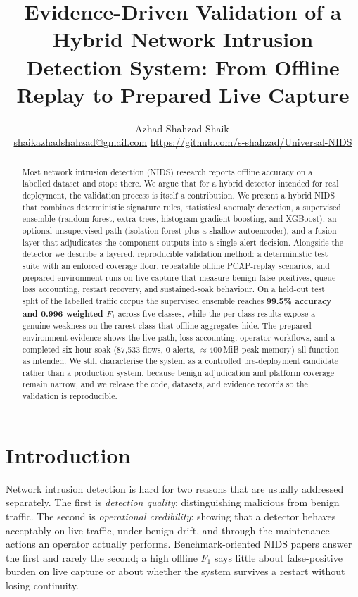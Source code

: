\documentclass[11pt]{article}
\title{Evidence-Driven Validation of a Hybrid Network Intrusion\\
Detection System: From Offline Replay to Prepared Live Capture}
\author{Azhad Shahzad Shaik\,\orcidlink{0009-0009-6450-5837}\\
\small \href{mailto:shaikazhadshahzad@gmail.com}{shaikazhadshahzad@gmail.com} \quad
\small \url{https://github.com/s-shahzad/Universal-NIDS}}
\date{\FILL{month year}}
\begin{document}
\maketitle

\begin{abstract}
Most network intrusion detection (NIDS) research reports offline accuracy on a
labelled dataset and stops there. We argue that for a hybrid detector intended
for real deployment, the validation process is itself a contribution. We present
a hybrid NIDS that combines deterministic signature rules, statistical anomaly
detection, a supervised ensemble (random forest, extra-trees, histogram gradient
boosting, and XGBoost), an optional unsupervised path (isolation forest plus a
shallow autoencoder), and a fusion layer that adjudicates the component outputs
into a single alert decision. Alongside the detector we describe a layered,
reproducible validation method: a deterministic test suite with an enforced
coverage floor, repeatable offline PCAP-replay scenarios, and prepared-environment
runs on live capture that measure benign false positives, queue-loss accounting,
restart recovery, and sustained-soak behaviour. On a held-out test split of the
labelled traffic corpus the supervised ensemble reaches
\textbf{99.5\% accuracy and 0.996 weighted $F_1$} across five classes, while the
per-class results expose a genuine weakness on the rarest class that offline
aggregates hide. The prepared-environment evidence shows the live path, loss
accounting, operator workflows, and a completed six-hour soak (87{,}533 flows, 0
alerts, $\approx$400\,MiB peak memory) all function as intended. We still
characterise the system as a controlled pre-deployment candidate rather than a
production system, because benign adjudication and platform coverage remain
narrow, and we release the code, datasets, and evidence records so the validation
is reproducible.
\end{abstract}

\section{Introduction}

Network intrusion detection is hard for two reasons that are usually addressed
separately. The first is \emph{detection quality}: distinguishing malicious from
benign traffic. The second is \emph{operational credibility}: showing that a
detector behaves acceptably on live traffic, under benign drift, and through the
maintenance actions an operator actually performs. Benchmark-oriented NIDS papers
answer the first and rarely the second; a high offline $F_1$ says little about
false-positive burden on live capture or about whether the system survives a
restart without losing continuity.
\end{document}
